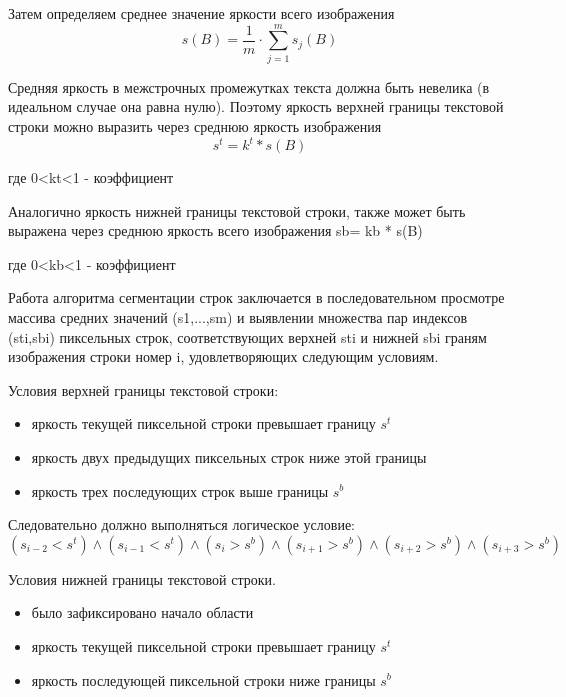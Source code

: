 Затем определяем среднее значение яркости всего изображения
\begin{displaymath}s(B) = \frac{1}{m}\cdot\sum\limits_{j=1}^{m} s_j(B)\end{displaymath}

Средняя яркость в межстрочных промежутках текста должна быть невелика (в идеальном случае она равна нулю). Поэтому яркость верхней границы текстовой строки можно выразить через среднюю яркость изображения
\begin{displaymath}s^{t} = k^{t} * s(B)\end{displaymath}

где 0<kt<1 - коэффициент

Аналогично яркость нижней границы текстовой строки, также может быть выражена через среднюю яркость всего изображения
sb= kb * s(B)

где 0<kb<1 - коэффициент

Работа алгоритма сегментации строк заключается в последовательном просмотре массива средних значений (s1,...,sm) и выявлении множества пар индексов (sti,sbi) пиксельных строк, соответствующих верхней sti и нижней sbi граням изображения строки номер i, удовлетворяющих следующим условиям.

Условия верхней границы текстовой строки:
\begin{itemize}
  \item яркость текущей пиксельной строки превышает границу $ s^{t} $
  \item яркость двух предыдущих пиксельных строк ниже этой границы
  \item яркость трех последующих строк выше границы $ s^{b} $
\end{itemize}

Следовательно должно выполняться логическое условие:
\begin{displaymath}(s_{i-2} < s^{t}) \wedge (s_{i-1} < s^{t}) \wedge (s_i > s^{b}) \wedge (s_{i+1} > s^{b}) \wedge (s_{i+2} > s^{b}) \wedge (s_{i+3} > s^{b})\end{displaymath}

Условия нижней границы текстовой строки.
\begin{itemize}     
  \item было зафиксировано начало области
  \item яркость текущей пиксельной строки превышает границу $ s^{t} $
  \item яркость последующей пиксельной строки ниже границы $ s^{b} $
\end{itemize}
     
